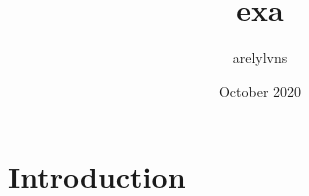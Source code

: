 \documentclass{article}
\title{exa}
\author{arelylvns }
\date{October 2020}
\begin{document}
\maketitle

\section{Introduction}
\end{document}
